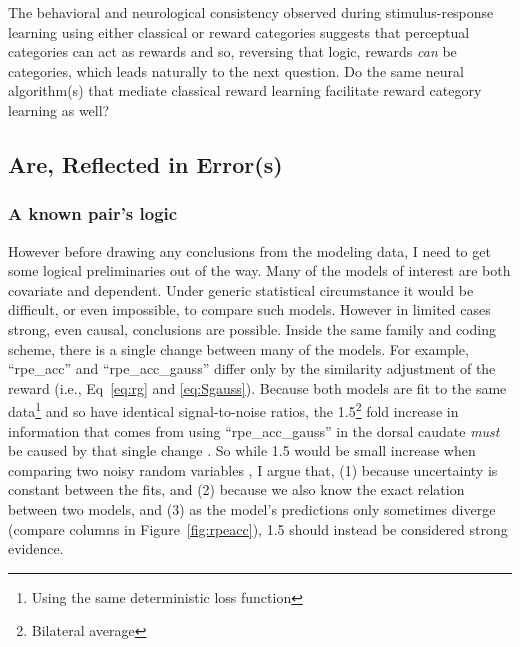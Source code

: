 The behavioral and neurological consistency observed during stimulus-response learning using either classical or reward categories suggests that perceptual categories can act as rewards and so, reversing that logic, rewards \emph{can} be categories, which leads naturally to the next question. Do the same neural algorithm(s) that mediate classical reward learning facilitate reward category learning as well?

\subsection{Are, Reflected in Error(s)}
\label{sub:inerror}
\subsubsection{A known pair's logic}
\label{subsub:onestep}
However before drawing any conclusions from the modeling data, I need to get some logical preliminaries out of the way.  Many of the models of interest are both covariate and dependent.  Under generic statistical circumstance it would be difficult, or even impossible, to compare such models.  However in limited cases strong, even causal, conclusions are possible.   Inside the same family and coding scheme, there is a single change between many of the models.  For example, ``rpe\_acc'' and ``rpe\_acc\_gauss'' differ only by the similarity adjustment of the reward (i.e., Eq~\ref{eq:rg} and \ref{eq:Sgauss}).  Because both models are fit to the same data\footnote{
    Using the same deterministic loss function} and so have identical signal-to-noise ratios, the 1.5\footnote{Bilateral average} fold increase in information that comes from using ``rpe\_acc\_gauss'' in the dorsal caudate \emph{must} be caused by that single change \cite{Pearl:2010p9726}.  So while 1.5 would be small increase when comparing two noisy random variables \cite{Anderson:2000p9475,Forster:2000p9623}, I argue that, (1) because uncertainty is constant between the fits, and (2) because we also know the exact relation between two models, and (3) as the model's predictions only sometimes diverge (compare columns in Figure~\ref{fig:rpeacc}), 1.5 should instead be considered strong evidence.

